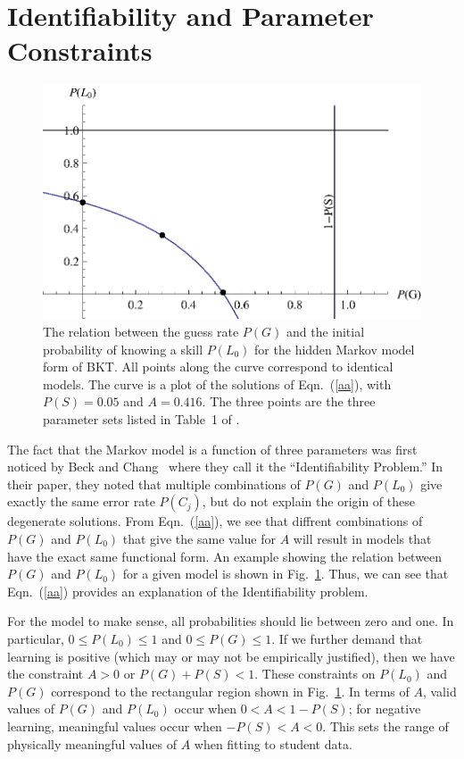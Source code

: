 \documentclass{acmlarge-edm}
\begin{document}
\section{Identifiability and Parameter Constraints}

\begin{figure}
\centering\includegraphics{table1.eps}
\caption{The relation between the guess rate $P(G)$ and the initial
  probability of knowing a skill $P(L_0)$ for the hidden
  Markov model form of BKT.  All points along the curve correspond
  to identical models.
  The curve is a plot of the solutions of Eqn.~(\ref{aa}), with $P(S)=0.05$ and $A=0.416$.
  The three points are the three parameter sets listed in Table~1 of
  \cite{beck_identifiability:_2007}.
}
 \label{table1}
\end{figure}

The fact that the Markov model is a function of three parameters
was first noticed by Beck and Chang~\citeyear{beck_identifiability:_2007} 
where they call it the ``Identifiability Problem.''   In their paper, 
they noted that multiple combinations of $P(G)$ and $P(L_0)$ give
exactly the same error rate $P(C_j)$, but do not explain the origin of 
these degenerate solutions.  From Eqn.~(\ref{aa}), we see that diffrent
combinations of $P(G)$ and $P(L_0)$ that give the same value for
$A$ will result in models that have the exact same functional form.   
An example showing the relation
between $P(G)$ and $P(L_0)$ for a given model is shown in Fig.~\ref{table1}.
Thus, we can see that Eqn.~(\ref{aa}) provides an explanation
of the Identifiability problem.

For the model to make sense, all probabilities should lie between 
zero and one.  In particular, $0\le P(L_0)\le 1$ and $0\le P(G) \le 1$.
If we further demand that learning is positive (which may or may not be
empirically justified), then we have the constraint $A>0$ or $P(G)+P(S)<1$.  
These constraints on $P(L_0)$ and $P(G)$ correspond to the rectangular
region shown in Fig.~\ref{table1}. 
In terms of $A$, valid values of $P(G)$ and $P(L_0)$ occur when
$0<A<1-P(S)$; for negative learning, meaningful values occur when
$-P(S)<A<0$.  This sets the range of physically meaningful values of
$A$ when fitting to student data.
\end{document}
